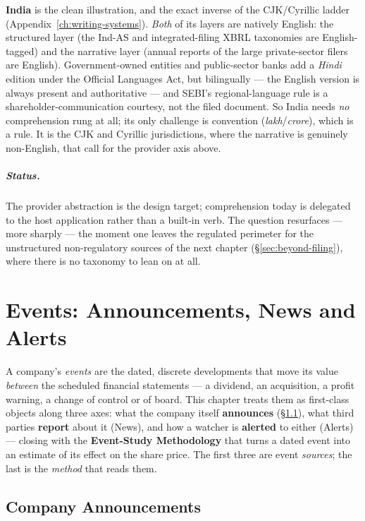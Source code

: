 \documentclass[11pt,a4paper]{report}
\begin{document}
\textbf{India} is the clean illustration, and the exact inverse of the CJK/Cyrillic ladder
(Appendix~\ref{ch:writing-systems}). \emph{Both} of its layers are natively English: the structured layer
(the Ind-AS and integrated-filing XBRL taxonomies are English-tagged) and the narrative layer (annual reports
of the large private-sector filers are English). Government-owned entities and public-sector banks add a
\emph{Hindi} edition under the Official Languages Act, but bilingually --- the English version is always
present and authoritative --- and SEBI's regional-language rule is a shareholder-communication courtesy, not
the filed document. So India needs \emph{no} comprehension rung at all; its only challenge is convention
(\emph{lakh}/\emph{crore}), which is a rule. It is the CJK and Cyrillic jurisdictions, where the narrative is
genuinely non-English, that call for the provider axis above.

\paragraph{Status.} The provider abstraction is the design target; comprehension today is delegated to the
host application rather than a built-in verb. The question resurfaces --- more sharply --- the moment one
leaves the regulated perimeter for the unstructured non-regulatory sources of the next chapter
(\S\ref{sec:beyond-filing}), where there is no taxonomy to lean on at all.

\chapter{Events: Announcements, News and Alerts}
\label{ch:events}

A company's \emph{events} are the dated, discrete developments that move its value \emph{between} the
scheduled financial statements --- a dividend, an acquisition, a profit warning, a change of control or of
board. This chapter treats them as first-class objects along three axes: what the company itself
\textbf{announces} (\S\ref{sec:events-announcements}), what third parties \textbf{report} about it (News),
and how a watcher is \textbf{alerted} to either (Alerts) --- closing with the \textbf{Event-Study
Methodology} that turns a dated event into an estimate of its effect on the share price. The first three are
event \emph{sources}; the last is the \emph{method} that reads them.

\section{Company Announcements}\label{sec:events-announcements}
\end{document}
